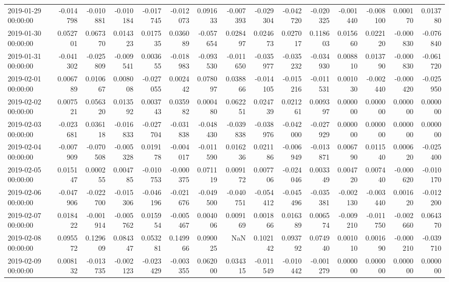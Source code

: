 \begin{tabular}{lrrrrrrrrrrrrrr}
2019-01-29 00:00:00 & -0.014798 & -0.010881 & -0.010184 & -0.017745 & -0.012073 & 0.091633 & -0.007393 & -0.029304 & -0.042720 & -0.020325 & -0.001440 & -0.008100 & 0.000170 & 0.013780 \\
2019-01-30 00:00:00 & 0.052701 & 0.067370 & 0.014323 & 0.017535 & 0.036089 & -0.057654 & 0.028497 & 0.024673 & 0.027017 & 0.118603 & 0.015660 & 0.022120 & -0.000830 & -0.076840 \\
2019-01-31 00:00:00 & -0.041302 & -0.025809 & -0.009541 & 0.003655 & -0.018983 & -0.093530 & -0.011650 & -0.035977 & -0.035232 & -0.034930 & 0.008810 & 0.013790 & -0.000830 & -0.061720 \\
2019-02-01 00:00:00 & 0.006789 & 0.010667 & 0.008008 & -0.027055 & 0.002442 & 0.078097 & 0.038866 & -0.014105 & -0.015216 & -0.011531 & 0.001030 & -0.002440 & -0.000420 & -0.025950 \\
2019-02-02 00:00:00 & 0.007521 & 0.056320 & 0.013592 & 0.003743 & 0.035982 & 0.000480 & 0.062251 & 0.024739 & 0.021261 & 0.009397 & 0.000000 & 0.000000 & 0.000000 & 0.000000 \\
2019-02-03 00:00:00 & -0.023681 & 0.036118 & -0.016833 & -0.027704 & -0.031838 & -0.048430 & -0.039838 & -0.038976 & -0.042000 & -0.027929 & 0.000000 & 0.000000 & 0.000000 & 0.000000 \\
2019-02-04 00:00:00 & -0.007909 & -0.070508 & -0.005328 & 0.019178 & -0.004017 & -0.011590 & 0.016236 & 0.021186 & -0.006949 & -0.013871 & 0.006790 & 0.011540 & 0.000620 & -0.025400 \\
2019-02-05 00:00:00 & 0.015147 & 0.000255 & 0.004785 & -0.010753 & -0.000375 & 0.071119 & 0.009172 & 0.007706 & -0.024046 & 0.003349 & 0.004720 & 0.007440 & -0.000620 & -0.010170 \\
2019-02-06 00:00:00 & -0.047906 & -0.022700 & -0.015306 & -0.046196 & -0.021676 & -0.049500 & -0.040751 & -0.054412 & -0.045496 & -0.035381 & -0.002130 & -0.003440 & 0.001620 & -0.012200 \\
2019-02-07 00:00:00 & 0.018422 & -0.001914 & -0.005762 & 0.015954 & -0.005467 & 0.004006 & 0.009169 & 0.001866 & 0.016389 & 0.006574 & -0.009210 & -0.011750 & -0.002660 & 0.064370 \\
2019-02-08 00:00:00 & 0.095572 & 0.129609 & 0.084347 & 0.053281 & 0.149966 & 0.090025 & NaN & 0.102142 & 0.093792 & 0.074940 & 0.001010 & 0.001690 & -0.000210 & -0.039710 \\
2019-02-09 00:00:00 & 0.008132 & -0.013735 & -0.002123 & -0.023429 & -0.003355 & 0.062000 & 0.034315 & -0.011549 & -0.010442 & -0.001279 & 0.000000 & 0.000000 & 0.000000 & 0.000000 \\

\end{tabular}
